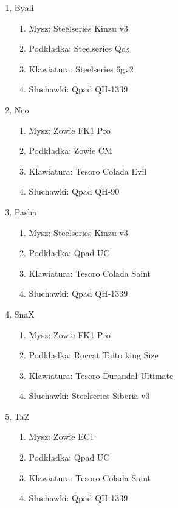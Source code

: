 \documentclass{article}
\begin{document}
\begin{enumerate}
  \item Byali
  \begin{enumerate}
    \item Mysz: Steelseries Kinzu v3
    \item Podkładka: Steelseries Qck
    \item Klawiatura: Steelseries 6gv2
    \item Słuchawki: Qpad QH-1339
  \end{enumerate}
  \item Neo
  \begin{enumerate}
    \item Mysz: Zowie FK1 Pro
    \item Podkładka: Zowie CM
    \item Klawiatura: Tesoro Colada Evil
    \item Słuchawki: Qpad QH-90
  \end{enumerate}
  \item Pasha
  \begin{enumerate}
    \item Mysz: Steelseries Kinzu v3
    \item Podkładka: Qpad UC
    \item Klawiatura: Tesoro Colada Saint
    \item Słuchawki: Qpad QH-1339
  \end{enumerate}
  \item SnaX
  \begin{enumerate}
    \item Mysz: Zowie FK1 Pro
    \item Podkładka: Roccat Taito king Size
    \item Klawiatura: Tesoro Durandal Ultimate
    \item Słuchawki: Steelseries Siberia v3
  \end{enumerate}
  \item TaZ
  \begin{enumerate}
    \item Mysz: Zowie EC1`
    \item Podkładka: Qpad UC
    \item Klawiatura: Tesoro Colada Saint
    \item Słuchawki: Qpad QH-1339
  \end{enumerate}
\end{enumerate}
\end{document}
